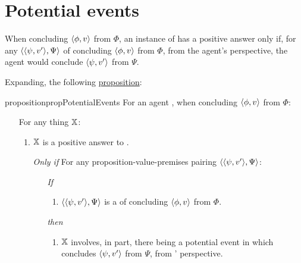 \section{Potential events}
\label{sec:positive-answers-qzs}

\begin{note}

  When concluding \(\pv{\phi}{v}\) from \(\Phi\), an instance of \qzS{} has a positive answer only if, for any \requ{} \(\pvp{\psi}{v'}{\Psi}\) of concluding \(\pv{\phi}{v}\) from \(\Phi\), from the agent's perspective, the agent would conclude \(\pv{\psi}{v'}\) from \(\Psi\).

  Expanding, the following \hyperref[prop:PWEs]{proposition}:

  \begin{restatable}{proposition}{propPotentialEvents}
    \label{prop:PWEs}
    For an agent \vAgent{}, when concluding \(\pv{\phi}{v}\) from \(\Phi\):

    \begin{itemize}
    \item[]
      For any thing \(\qzSaV{}\):
      \begin{enumerate}[label=\alph*., ref=(\alph*)]
      \item
        \label{prop:PWEs:a}
        \(\qzSaV{}\) is a positive answer to \qzS{}.
      \end{enumerate}
      \begin{itemize}
      \item[\emph{Only if}]
        For any proposition-value-premises pairing \(\pvp{\psi}{v'}{\Psi}\):
        \begin{itemize}
        \item[\emph{If}]
          \begin{enumerate}[label=\alph*., ref=(\alph*), resume]
          \item
            \label{prop:PWEs:b}
            \(\pvp{\psi}{v'}{\Psi}\) is a \requ{} of \vAgent{} concluding \(\pv{\phi}{v}\) from \(\Phi\).
          \end{enumerate}
        \item[\emph{then}]
          \begin{enumerate}[label=\alph*., ref=(\alph*), resume]
          \item
            \label{prop:PWEs:c}
            \(\qzSaV{}\) involves, in part, there being a potential event in which \vAgent{} concludes \(\pv{\psi}{v'}\) from \(\Psi\), from \vAgent{}' perspective.
          \end{enumerate}
        \end{itemize}
      \end{itemize}
    \end{itemize}
  \end{restatable}


\end{note}
